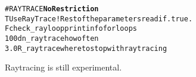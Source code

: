 \begin{alltt}
#RAYTRACE    \hfill  {\bf No Restriction}
T                      UseRayTrace    ! Rest of the parameters read if .true.
F                      check_rayloop print info for loops
100                    dn_raytrace   how often
3.0                    R_raytrace    where to stop with ray tracing
\end{alltt}

Raytracing is still experimental. 
\ \ \\





